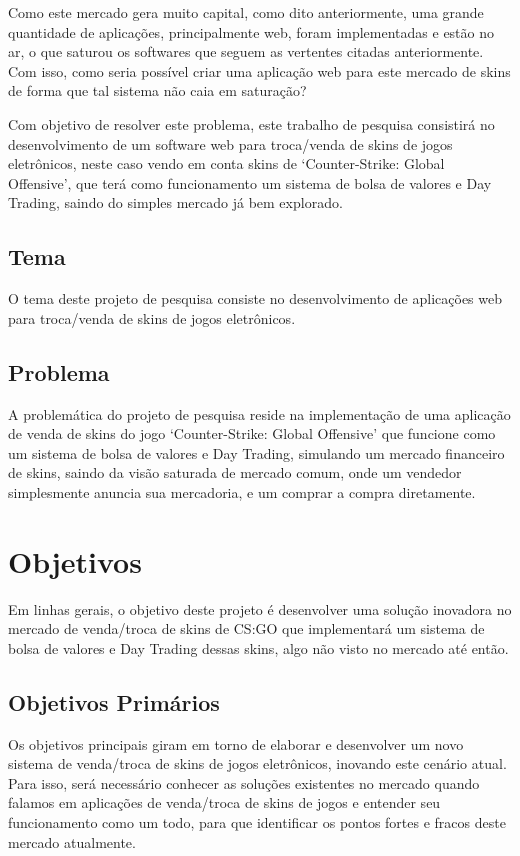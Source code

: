 \documentclass[a4paper, 12pt]{article}
\begin{document}
    Como este mercado gera muito capital, como dito anteriormente, uma grande quantidade de aplicações, principalmente web, foram implementadas e estão no ar, o que saturou os softwares que seguem as vertentes citadas anteriormente. Com isso, como seria possível criar uma aplicação web para este mercado de skins de forma que tal sistema não caia em saturação?
    
    Com objetivo de resolver este problema, este trabalho de pesquisa consistirá no desenvolvimento de um software web para troca/venda de skins de jogos eletrônicos, neste caso vendo em conta skins de ‘Counter-Strike: Global Offensive’, que terá como funcionamento um sistema de bolsa de valores e Day Trading, saindo do simples mercado já bem explorado.

    \subsection{Tema}
    O tema deste projeto de pesquisa consiste no desenvolvimento de aplicações web para troca/venda de skins de jogos eletrônicos.

    \subsection{Problema}
    A problemática do projeto de pesquisa reside na implementação de uma aplicação de venda de skins do jogo ‘Counter-Strike: Global Offensive’ que funcione como um sistema de bolsa de valores e Day Trading, simulando um mercado financeiro de skins, saindo da visão saturada de mercado comum, onde um vendedor simplesmente anuncia sua mercadoria, e um comprar a compra diretamente.

    \section{Objetivos}
    Em linhas gerais, o objetivo deste projeto é desenvolver uma solução inovadora no mercado de venda/troca de skins de CS:GO que implementará um sistema de bolsa de valores e Day Trading dessas skins, algo não visto no mercado até então.

    \subsection{Objetivos Primários}
    Os objetivos principais giram em torno de elaborar e desenvolver um novo sistema de venda/troca de skins de jogos eletrônicos, inovando este cenário atual. Para isso, será necessário conhecer as soluções existentes no mercado quando falamos em aplicações de venda/troca de skins de jogos e entender seu funcionamento como um todo, para que identificar os pontos fortes e fracos deste mercado atualmente.
\end{document}
